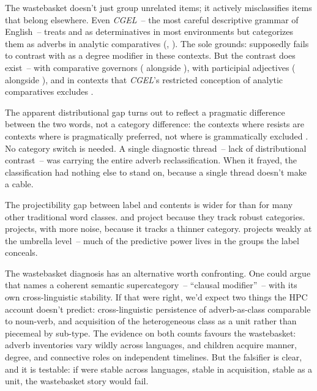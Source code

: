 The wastebasket doesn't just group unrelated items; it actively misclassifies items that belong elsewhere. Even \textit{CGEL}~-- the most careful descriptive grammar of English~-- treats  and  as determinatives in most environments but categorizes them as adverbs in analytic comparatives (, ). The sole grounds:  supposedly fails to contrast with  as a degree modifier in these contexts. But the contrast does exist~-- with comparative governors ( alongside ), with participial adjectives ( alongside ), and in contexts that \textit{CGEL}'s restricted conception of analytic comparatives excludes \citep{reynolds2024why}.

The apparent distributional gap turns out to reflect a pragmatic difference between the two words, not a category difference: the contexts where  resists are contexts where  is pragmatically preferred, not where  is grammatically excluded \citep[see][for the full argument]{reynolds2024why}. No category switch is needed. A single diagnostic thread~-- lack of distributional contrast~-- was carrying the entire adverb reclassification. When it frayed, the classification had nothing else to stand on, because a single thread doesn't make a cable.

The projectibility gap between label and contents is wider for  than for many other traditional word classes.  and  project because they track robust categories.  projects, with more noise, because it tracks a thinner category.  projects weakly at the umbrella level~-- much of the predictive power lives in the groups the label conceals.

The wastebasket diagnosis has an alternative worth confronting. One could argue that  names a coherent semantic supercategory~-- \enquote{clausal modifier}~-- with its own cross-linguistic stability. If that were right, we'd expect two things the HPC account doesn't predict: cross-linguistic persistence of adverb-as-class comparable to noun-verb, and acquisition of the heterogeneous class as a unit rather than piecemeal by sub-type. The evidence on both counts favours the wastebasket: adverb inventories vary wildly across languages, and children acquire manner, degree, and connective roles on independent timelines. But the falsifier is clear, and it is testable: if  were stable across languages, stable in acquisition, stable as a unit, the wastebasket story would fail.

